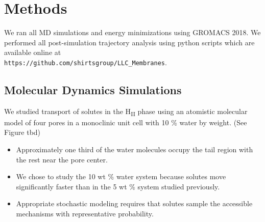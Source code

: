 \documentclass{article}
\begin{document}

  \section{Methods}
    
  We ran all MD simulations and energy minimizations using GROMACS 2018. We  %
  performed all post-simulation trajectory analysis using python scripts which are available
  online at \\ \texttt{https://github.com/shirtsgroup/LLC\_Membranes}.

  \subsection{Molecular Dynamics Simulations}

  We studied transport of solutes in the H\textsubscript{II} phase using an
  atomistic molecular model of four pores in a monoclinic unit cell with 
  10 \% water by weight. (See Figure tbd)
  \begin{itemize}
    \item Approximately one third of the water molecules occupy the tail region 
    with the rest near the pore center.
    \item We chose to study the 10 wt \% water system because solutes move 
    significantly faster than in the 5 wt \% system studied previously.
    \item Appropriate stochastic modeling requires that solutes sample the 
    accessible mechanisms with representative probability.  %
  \end{itemize}
  
\end{document}
